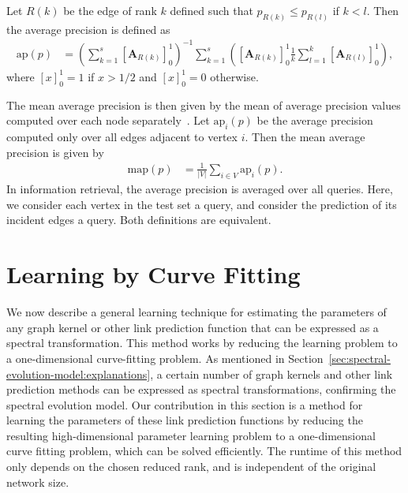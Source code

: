 \documentclass[11pt,a4paper]{book}
\begin{document}
Let $R(k)$ be the edge of rank $k$ defined such that $p_{R(k)} \leq
p_{R(l)}$ if $k < l$.  Then the average precision is defined as
\begin{align}
  \mathrm{ap}(p) &= \left( \sum_{k=1}^s \left[ \mathbf A_{R(k)}
    \right]_0^1 \right)^{-1} 
  \sum_{k=1}^s \left(\left[ \mathbf A_{R(k)}\right]_0^1 \frac 1 k \sum_{l=1}^k
  \left[ \mathbf A_{R(l)} \right]_0^1 \right), 
\end{align}
where $\left[x\right]_0^1 = 1$ if $x>1/2$ and $\left[x\right]_0^1=0$ otherwise. 

The mean average precision is then given by the mean of average
precision values computed over each node separately~\cite{b521}.  
Let $\mathrm{ap}_i(p)$ be the average precision computed only over all
edges adjacent to vertex $i$.  Then the mean average precision is given
by
\begin{align}
  \mathrm{map}(p) &= \frac 1 {|V|} \sum_{i\in V} \mathrm{ap}_i(p). 
\end{align}
In information retrieval, the average precision is averaged over all
queries.  Here, we consider each vertex in the test set a
query, and consider the prediction of its incident edges a query.  Both
definitions are equivalent. 

\section{Learning by Curve Fitting}
\label{sec:learning-by-curve-fitting}
We now describe a general learning technique for estimating the
parameters of any graph kernel or other link prediction function that
can be expressed as a spectral 
transformation.  This method works by reducing the 
learning problem to a one-dimensional curve-fitting problem.  
As mentioned in
Section~\ref{sec:spectral-evolution-model:explanations}, a
certain number of graph kernels and other link prediction methods 
can be expressed as spectral transformations, 
confirming the spectral evolution model.   
Our contribution in this section is a method for learning the parameters
of these link prediction functions by reducing  
the resulting high-dimensional parameter learning problem to
a one-dimensional curve fitting problem, which can be solved efficiently.
The runtime of this method only depends on the chosen reduced rank, and
is independent of the original network size.  
\end{document}
